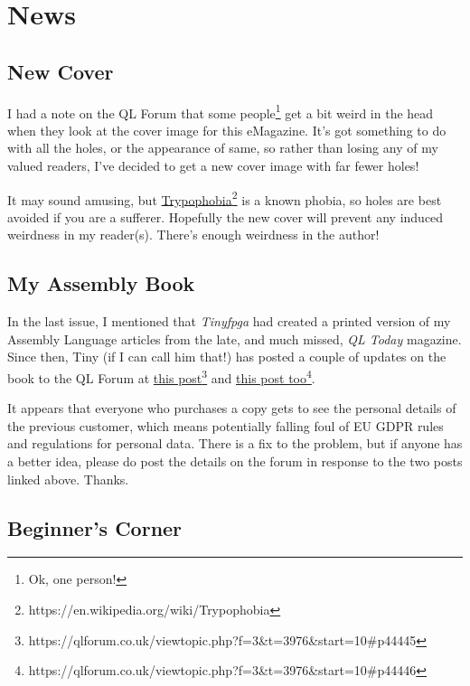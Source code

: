 
\chapter{News}

\section{New Cover}

I had a note on the QL Forum that some people\footnote{Ok, one person!}
get a bit weird in the head when they look at the cover image for
this eMagazine. It's got something to do with all the holes, or the
appearance of same, so rather than losing any of my valued readers,
I've decided to get a new cover image with far fewer holes! 

It may sound amusing, but \href{https://en.wikipedia.org/wiki/Trypophobia}{Trypophobia}\footnote{https://en.wikipedia.org/wiki/Trypophobia}
is a known phobia, so holes are best avoided if you are a sufferer.
Hopefully the new cover will prevent any induced weirdness in my reader(s).
There's enough weirdness in the author!

\section{My Assembly Book}

In the last issue, I mentioned that \emph{Tinyfpga} had created a
printed version of my Assembly Language articles from the late, and
much missed, \emph{QL Today} magazine. Since then, Tiny (if I can
call him that!) has posted a couple of updates on the book to the
QL Forum at \href{https://qlforum.co.uk/viewtopic.php?f=3&t=3976&start=10\#p44445}{this post}\footnote{https://qlforum.co.uk/viewtopic.php?f=3\&t=3976\&start=10\#p44445}
and \href{https://qlforum.co.uk/viewtopic.php?f=3&t=3976&start=10\#p44446}{this post too}\footnote{https://qlforum.co.uk/viewtopic.php?f=3\&t=3976\&start=10\#p44446}.

It appears that everyone who purchases a copy gets to see the personal
details of the previous customer, which means potentially falling
foul of EU GDPR rules and regulations for personal data. There is
a fix to the problem, but if anyone has a better idea, please do post
the details on the forum in response to the two posts linked above.
Thanks.

\section{Beginner's Corner}

